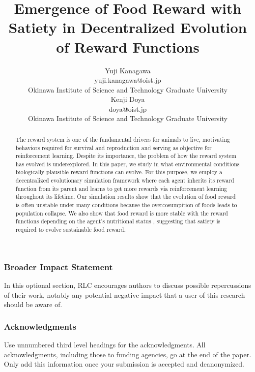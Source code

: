 \documentclass[10pt]{article} %
\title{Emergence of Food Reward with Satiety in Decentralized Evolution of Reward Functions}
\author{Yuji Kanagawa  \\
    yuji.kanagawa@oist.jp \\
    Okinawa Institute of Science and Technology Graduate University \\
    \And
    Kenji Doya \\
    doya@oist.jp\\
    Okinawa Institute of Science and Technology Graduate University
}
\newcommand{\1}{\mathbb{I} } %
\newcounter{num}
\begin{document}
\maketitle

\begin{abstract}
  The reward system is one of the fundamental drivers for animals to live, motivating behaviors required for survival and reproduction and serving as objective for reinforcement learning. Despite its importance, the problem of how the reward system has evolved is underexplored. In this paper, we study in what environmental conditions biologically plausible reward functions can evolve. For this purpose, we employ a decentralized evolutionary simulation framework where each agent inherits its reward function from its parent and learns to get more rewards via reinforcement learning throughout its lifetime. Our simulation results show that the evolution of food reward is often unstable under many conditions because the overcosumpition of foods
  leads to population collapse. We also show that food reward is more stable with the reward functions depending on the agent's nutritional status %
  , suggesting that satiety is required to evolve sustainable food reward.
\end{abstract}



\subsubsection*{Broader Impact Statement}
\label{sec:broaderImpact}
In this optional section, RLC encourages authors to discuss possible repercussions of their work, notably any potential negative impact that a user of this research should be aware of.

\subsubsection*{Acknowledgments}
\label{sec:ack}
Use unnumbered third level headings for the acknowledgments. All acknowledgments, including those to funding agencies, go at the end of the paper. Only add this information once your submission is accepted and deanonymized.




\appendix

\end{document}
